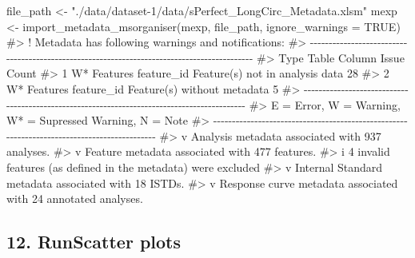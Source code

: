 \documentclass[
  letterpaper,
  DIV=11,
  numbers=noendperiod]{scrartcl}
\newenvironment{Shaded}{\begin{snugshade}}{\end{snugshade}}
\newcommand{\AttributeTok}[1]{\textcolor[rgb]{0.40,0.45,0.13}{#1}}
\newcommand{\CommentTok}[1]{\textcolor[rgb]{0.37,0.37,0.37}{#1}}
\newcommand{\ConstantTok}[1]{\textcolor[rgb]{0.56,0.35,0.01}{#1}}
\newcommand{\FunctionTok}[1]{\textcolor[rgb]{0.28,0.35,0.67}{#1}}
\newcommand{\NormalTok}[1]{\textcolor[rgb]{0.00,0.23,0.31}{#1}}
\newcommand{\OtherTok}[1]{\textcolor[rgb]{0.00,0.23,0.31}{#1}}
\newcommand{\StringTok}[1]{\textcolor[rgb]{0.13,0.47,0.30}{#1}}
\begin{document}
\begin{Shaded}
\begin{Highlighting}[]
\NormalTok{file\_path }\OtherTok{\textless{}{-}} \StringTok{"./data/dataset{-}1/data/sPerfect\_LongCirc\_Metadata.xlsm"}
\NormalTok{mexp }\OtherTok{\textless{}{-}} \FunctionTok{import\_metadata\_msorganiser}\NormalTok{(mexp, file\_path, }\AttributeTok{ignore\_warnings =} \ConstantTok{TRUE}\NormalTok{)}
\CommentTok{\#\textgreater{} ! Metadata has following warnings and notifications:}
\CommentTok{\#\textgreater{} {-}{-}{-}{-}{-}{-}{-}{-}{-}{-}{-}{-}{-}{-}{-}{-}{-}{-}{-}{-}{-}{-}{-}{-}{-}{-}{-}{-}{-}{-}{-}{-}{-}{-}{-}{-}{-}{-}{-}{-}{-}{-}{-}{-}{-}{-}{-}{-}{-}{-}{-}{-}{-}{-}{-}{-}{-}{-}{-}{-}{-}{-}{-}{-}{-}{-}{-}{-}{-}{-}{-}{-}{-}{-}{-}{-}{-}{-}{-}{-}{-}{-}{-}{-}{-}{-}{-}{-}{-}{-}{-}{-}}
\CommentTok{\#\textgreater{}   Type Table    Column     Issue                           Count}
\CommentTok{\#\textgreater{} 1 W*   Features feature\_id Feature(s) not in analysis data    28}
\CommentTok{\#\textgreater{} 2 W*   Features feature\_id Feature(s) without metadata         5}
\CommentTok{\#\textgreater{} {-}{-}{-}{-}{-}{-}{-}{-}{-}{-}{-}{-}{-}{-}{-}{-}{-}{-}{-}{-}{-}{-}{-}{-}{-}{-}{-}{-}{-}{-}{-}{-}{-}{-}{-}{-}{-}{-}{-}{-}{-}{-}{-}{-}{-}{-}{-}{-}{-}{-}{-}{-}{-}{-}{-}{-}{-}{-}{-}{-}{-}{-}{-}{-}{-}{-}{-}{-}{-}{-}{-}{-}{-}{-}{-}{-}{-}{-}{-}{-}{-}{-}{-}{-}{-}{-}{-}{-}{-}{-}{-}{-}}
\CommentTok{\#\textgreater{} E = Error, W = Warning, W* = Supressed Warning, N = Note}
\CommentTok{\#\textgreater{} {-}{-}{-}{-}{-}{-}{-}{-}{-}{-}{-}{-}{-}{-}{-}{-}{-}{-}{-}{-}{-}{-}{-}{-}{-}{-}{-}{-}{-}{-}{-}{-}{-}{-}{-}{-}{-}{-}{-}{-}{-}{-}{-}{-}{-}{-}{-}{-}{-}{-}{-}{-}{-}{-}{-}{-}{-}{-}{-}{-}{-}{-}{-}{-}{-}{-}{-}{-}{-}{-}{-}{-}{-}{-}{-}{-}{-}{-}{-}{-}{-}{-}{-}{-}{-}{-}{-}{-}{-}{-}{-}{-}}
\CommentTok{\#\textgreater{} v Analysis metadata associated with 937 analyses.}
\CommentTok{\#\textgreater{} v Feature metadata associated with 477 features.}
\CommentTok{\#\textgreater{} i 4 invalid features (as defined in the metadata) were excluded}
\CommentTok{\#\textgreater{} v Internal Standard metadata associated with 18 ISTDs.}
\CommentTok{\#\textgreater{} v Response curve metadata associated with 24 annotated analyses.}
\end{Highlighting}
\end{Shaded}

\subsection{12. RunScatter plots}\label{runscatter-plots}
\end{document}
